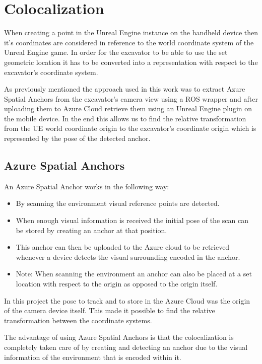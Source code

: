 \chapter{Colocalization}\label{ch:colocalization}

When creating a point in the Unreal Engine instance on the handheld device then it's coordinates are considered in reference to the world coordinate system of the Unreal Engine game. In order for the excavator to be able to use the set geometric location it has to be converted into a representation with respect to the excavator's coordinate system.

As previously mentioned the approach used in this work was to extract Azure Spatial Anchors from the excavator's camera view using a ROS wrapper and after uploading them to Azure Cloud retrieve them using an Unreal Engine plugin on the mobile device. In the end this allows us to find the relative transformation from the UE world coordinate origin to the excavator's coordinate origin which is represented by the pose of the detected anchor.

\section{Azure Spatial Anchors}\label{sec:azure_spatial_anchors}

An Azure Spatial Anchor works in the following way: 
\begin{itemize}
    \item By scanning the environment visual reference points are detected.
    \item When enough visual information is received the initial pose of the scan can be stored by creating an anchor at that position.
    \item This anchor can then be uploaded to the Azure cloud to be retrieved whenever a device detects the visual surrounding encoded in the anchor.
    \item Note: When scanning the environment an anchor can also be placed at a set location with respect to the origin as opposed to the origin itself.
\end{itemize}

In this project the pose to track and to store in the Azure Cloud was the origin of the camera device itself. This made it possible to find the relative transformation between the coordinate systems.

The advantage of using Azure Spatial Anchors is that the colocalization is completely taken care of by creating and detecting an anchor due to the visual information of the environment that is encoded within it.

